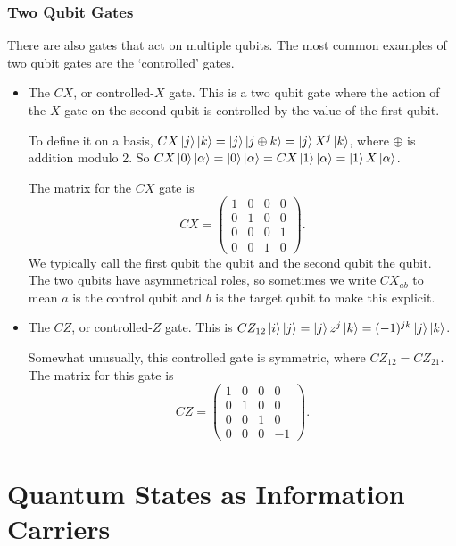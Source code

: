 \documentclass[a4paper]{article}
\begin{document}
\subsubsection{Two Qubit Gates}

There are also gates that act on multiple qubits.
The most common examples of two qubit gates are the `controlled' gates.

\begin{itemize}
	\item The $CX$, or controlled-$X$ gate. This is a two qubit gate where the action of the $X$ gate on the second qubit is controlled by the value of the first qubit.
	
	To define it on a basis, $CX \ket{j}\ket{k} = \ket{j} \ket{j \oplus k} = \ket{j} X^{j} \ket{k}$, where $\oplus$ is addition modulo 2. So $CX \ket{0} \ket{\alpha} = \ket{0} \ket{\alpha} = CX\ket{1}\ket{\alpha} = \ket{1} X \ket{\alpha}$.

	The matrix for the $CX$ gate is
	$$
	CX = \begin{pmatrix}
		1 & 0 & 0 & 0 \\
		0 & 1 & 0 & 0 \\
		0 & 0 & 0 & 1 \\
		0 & 0 & 1 & 0
	\end{pmatrix}.
	$$
	We typically call the first qubit the  qubit and the second qubit the  qubit. The two qubits have asymmetrical roles, so sometimes we write $CX_{ab}$ to mean $a$ is the control qubit and $b$ is the target qubit to make this explicit.

	\item The $CZ$, or controlled-$Z$ gate. This is $CZ_{12}\ket{i}\ket{j} = \ket{j} z^j\ket{k} = (-1)^{jk}\ket{j}\ket{k}$. 
	
	Somewhat unusually, this controlled gate is symmetric, where $CZ_{12} = CZ_{21}$. The matrix for this gate is
	$$
		CZ = \begin{pmatrix}
			1 & 0 & 0 & 0 \\
			0 & 1 & 0 & 0 \\
			0 & 0 & 1 & 0 \\
			0 & 0 & 0 & -1 
		\end{pmatrix}.
	$$
\end{itemize}

\section{Quantum States as Information Carriers}
\end{document}
